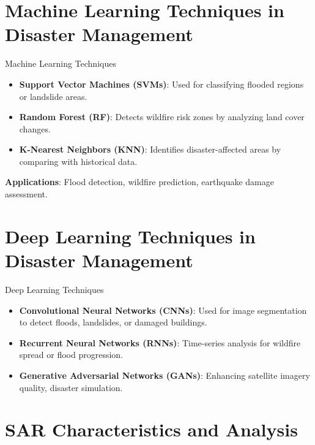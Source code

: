 \documentclass[10pt]{beamer}
\begin{document}
\section{Machine Learning Techniques in Disaster Management}
\begin{frame}{Machine Learning Techniques}
    \begin{itemize}
        \item \textbf{Support Vector Machines (SVMs)}: Used for classifying flooded regions or landslide areas.
        \item \textbf{Random Forest (RF)}: Detects wildfire risk zones by analyzing land cover changes.
        \item \textbf{K-Nearest Neighbors (KNN)}: Identifies disaster-affected areas by comparing with historical data.
    \end{itemize}
    \vspace{5mm}
    \textbf{Applications}: Flood detection, wildfire prediction, earthquake damage assessment.
\end{frame}

\section{Deep Learning Techniques in Disaster Management}
\begin{frame}{Deep Learning Techniques}
    \begin{itemize}
        \item \textbf{Convolutional Neural Networks (CNNs)}: Used for image segmentation to detect floods, landslides, or damaged buildings.
        \item \textbf{Recurrent Neural Networks (RNNs)}: Time-series analysis for wildfire spread or flood progression.
        \item \textbf{Generative Adversarial Networks (GANs)}: Enhancing satellite imagery quality, disaster simulation.
    \end{itemize}
\end{frame}

\section{SAR Characteristics and Analysis}
\end{document}
